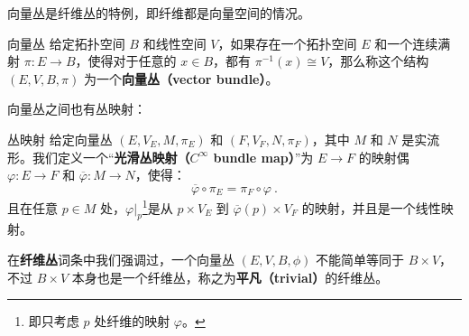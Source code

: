 
向量丛是纤维丛的特例，即纤维都是向量空间的情况。

\begin{definition}{向量丛}
给定拓扑空间 $B$ 和线性空间 $V$，如果存在一个拓扑空间 $E$ 和一个连续满射 $\pi:E\rightarrow B$，使得对于任意的 $x\in B$，都有 $\pi^{-1}(x)\cong V$，那么称这个结构 $(E, V, B, \pi)$ 为一个\textbf{向量丛（vector bundle）}。
\end{definition}

向量丛之间也有丛映射：

\begin{definition}{丛映射}
给定向量丛 $(E, V_E, M, \pi_E)$ 和 $(F, V_F, N, \pi_F)$，其中 $M$ 和 $N$ 是实流形。我们定义一个“\textbf{光滑丛映射（$C^\infty$ bundle map）}”为 $E\rightarrow F$ 的映射偶 $\varphi: E\rightarrow F$ 和 $\overline{\varphi}: M\rightarrow N$，使得：
\begin{equation}
\overline{\varphi}\circ\pi_E=\pi_F\circ\varphi~.
\end{equation}
且在任意 $p\in M$ 处，$\varphi|_p$\footnote{即只考虑 $p$ 处纤维的映射 $\varphi$。}是从 $p\times V_E$ 到 $\overline{\varphi}(p)\times V_F$ 的映射，并且是一个线性映射。
\end{definition}

在\textbf{纤维丛}词条中我们强调过，一个向量丛 $(E, V, B, \phi)$ 不能简单等同于 $B\times V$，不过 $B\times V$ 本身也是一个纤维丛，称之为\textbf{平凡（trivial）}的纤维丛。




